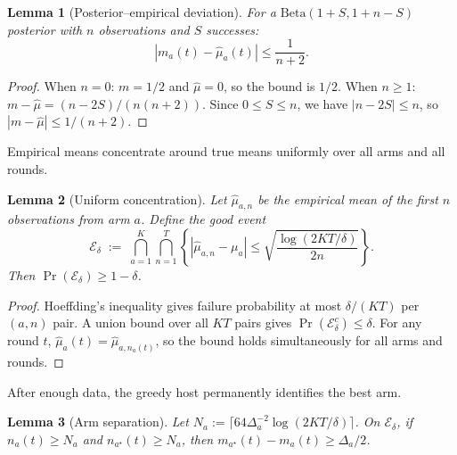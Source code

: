 \documentclass{article}
\newtheorem{lemma} {Lemma}
\begin{document}
\begin{lemma}[Posterior--empirical deviation]
\label{lem:shrinkage}
For a $\mathrm{Beta}(1+S, 1+n-S)$ posterior with $n$ observations and $S$ successes:
\[
  |m_a(t) - \hat\mu_a(t)| \le \frac{1}{n+2}.
\]
\end{lemma}

\begin{proof}
When $n = 0$: $m = 1/2$ and $\hat\mu = 0$, so the bound is $1/2$.
When $n \ge 1$: $m - \hat\mu = (n - 2S)/(n(n+2))$.
Since $0 \le S \le n$, we have $|n - 2S| \le n$, so $|m - \hat\mu| \le 1/(n+2)$.
\end{proof}


Empirical means concentrate around true means uniformly over all arms and all rounds.

\begin{lemma}[Uniform concentration]
\label{lem:concentration}
Let $\hat\mu_{a,n}$ be the empirical mean of the first $n$ observations from arm $a$.
Define the good event
\[
  \mathcal{E}_\delta
  \;:=\;
  \bigcap_{a=1}^K \bigcap_{n=1}^T
  \left\{
    |\hat\mu_{a,n} - \mu_a|
    \le
    \sqrt{\frac{\log(2KT/\delta)}{2n}}
  \right\}.
\]
Then $\Pr(\mathcal{E}_\delta) \ge 1 - \delta$.
\end{lemma}

\begin{proof}
Hoeffding's inequality gives failure probability at most $\delta/(KT)$ per $(a,n)$ pair.
A union bound over all $KT$ pairs gives $\Pr(\mathcal{E}_\delta^c) \le \delta$.
For any round $t$, $\hat\mu_a(t) = \hat\mu_{a,n_a(t)}$, so the bound holds simultaneously for all arms and rounds.
\end{proof}


After enough data, the greedy host permanently identifies the best arm.

\begin{lemma}[Arm separation]
\label{lem:separation}
Let $N_a := \lceil 64\Delta_a^{-2}\log(2KT/\delta)\rceil$.
On $\mathcal{E}_\delta$, if $n_a(t) \ge N_a$ and $n_{a^\star}(t) \ge N_a$, then $m_{a^\star}(t) - m_a(t) \ge \Delta_a/2$.
\end{lemma}
\end{document}
